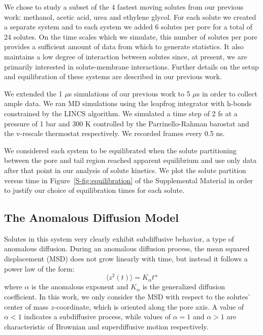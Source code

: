 \documentclass[aps,pre,preprint,groupedaddress,longbibliography]{revtex4-2}
\begin{document}
  We chose to study a subset of the 4 fastest moving solutes from our previous
  work: methanol, acetic acid, urea and ethylene glycol. For each solute we 
  created a separate system and to each system we added 6 solutes per pore 
  for a total of 24 solutes. On the time scales which we simulate, this number
  of solutes per pore provides a sufficient amount of data from which to 
  generate statistics. It also maintains a low degree of interaction between
  solutes since, at present, we are primarily interested in solute-membrane 
  interactions. Further details on the setup and equilibration of these systems
  are described in our previous work.\cite{coscia_chemically_2019}
  
  We extended the 1 $\mu$s simulations of our previous work to 5 $\mu$s in order
  to collect ample data. We ran MD simulations using the leapfrog integrator with 
  h-bonds constrained by the LINCS algorithm. We simulated a time step of 2 fs at
  a pressure of 1 bar and 300 K controlled by the Parrinello-Rahman barostat and
  the v-rescale thermostat respectively. We recorded frames every 0.5 ns.
  
  We considered each system to be equilibrated when the solute partitioning between the 
  pore and tail region reached apparent equilibrium and use only data after that point
  in our analysis of solute kinetics. We plot the solute partition versus time in
  Figure~\ref{S-fig:equilibration} of the Supplemental Material in order to justify
  our choice of equilibration times for each solute.

  \subsection{The Anomalous Diffusion Model}\label{method:model_sFBM}

  Solutes in this system very clearly exhibit subdiffusive behavior, a type of
  anomalous diffusion. During an anomalous diffusion process, the mean squared 
  displacement (MSD) does not grow linearly with time, but instead it follows 
  a power law of the form: 
  \begin{equation} 
  \langle z^2(t) \rangle = K_{\alpha}t^{\alpha}
  \label{eqn:msd_form}
  \end{equation} 
  where $\alpha$ is the anomalous exponent and $K_{\alpha}$ is the generalized 
  diffusion coefficient. In this work, we only consider the MSD with respect to
  the solutes' center of mass $z$-coordinate, which is oriented along the pore 
  axis. A value of $\alpha < 1$ indicates a subdiffusive process, while values
  of $\alpha = 1$ and $\alpha > 1$ are characteristic of Brownian and 
  superdiffusive motion respectively.
 
\end{document}
